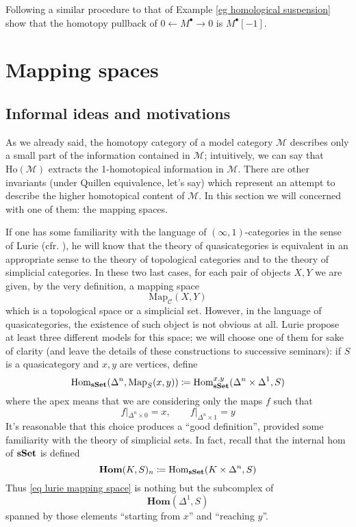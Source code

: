 \begin{refsection}
\begin{exercise} \label{exo homological loop}
Following a similar procedure to that of Example \ref{eg homological suspension} show that the homotopy pullback of $0 \leftarrow M^\bullet \rightarrow 0$ is $M^\bullet[-1]$.
\end{exercise}

\section{Mapping spaces}

\subsection{Informal ideas and motivations}

As we already said, the homotopy category of a model category $\mathcal M$ describes only a small part of the information contained in $\mathcal M$; intuitively, we can say that $\mathrm{Ho}(\mathcal M)$ extracts the 1-homotopical information in $\mathcal M$. There are other invariants (under Quillen equivalence, let's say) which represent an attempt to describe the higher homotopical content of $\mathcal M$. In this section we will concerned with one of them: the mapping spaces.

If one has some familiarity with the language of $(\infty,1)$-categories in the sense of Lurie (cfr. \cite{htt}), he will know that the theory of quasicategories is equivalent in an appropriate sense to the theory of topological categories and to the theory of simplicial categories. In these two last cases, for each pair of objects $X,Y$ we are given, by the very definition, a mapping space
\[
\mathrm{Map}_{\mathcal C}(X,Y)
\]
which is a topological space or a simplicial set. However, in the language of quasicategories, the existence of such object is not obvious at all. Lurie propose at least three different models for this space; we will choose one of them for sake of clarity (and leave the details of these constructions to successive seminars): if $S$ is a quasicategory and $x,y$ are vertices, define
\begin{equation} \label{eq lurie mapping space}
\mathrm{Hom}_{\mathbf{s\,\!\mathbf{Set}}}(\Delta^n, \mathrm{Map}_S(x,y))\coloneqq \mathrm{Hom}_{\mathbf{s\,\!\mathbf{Set}}}^{x,y}(\Delta^n \times \Delta^1, S)
\end{equation}
where the apex means that we are considering only the maps $f$ such that
\[
f |_{\Delta^n \times 0} = x, \qquad f |_{\Delta^n \times 1} = y
\]
It's reasonable that this choice produces a ``good definition'', provided some familiarity with the theory of simplicial sets. In fact, recall that the internal hom of $\mathbf{s\,\!\mathbf{Set}}$ is defined
\[
\mathbf{Hom}(K,S)_n\coloneqq \mathrm{Hom}_{\mathbf{s\,\!\mathbf{Set}}}(K \times \Delta^n, S)
\]
Thus \eqref{eq lurie mapping space} is nothing but the subcomplex of
\[
\mathbf{Hom}(\Delta^1,S)
\]
spanned by those elements ``starting from $x$'' and ``reaching $y$''.


\end{refsection}

